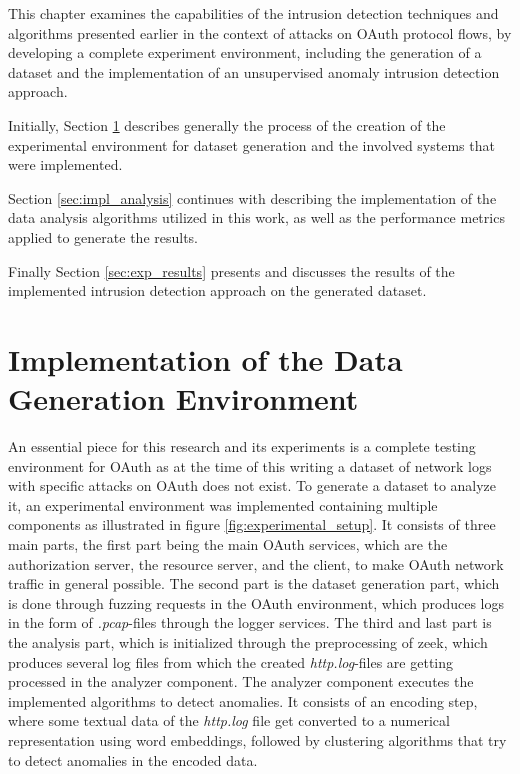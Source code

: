 
This chapter examines the capabilities of the intrusion detection techniques and algorithms presented earlier in the context of attacks on OAuth protocol flows, by developing a complete experiment environment, including the generation of a dataset and the implementation of an unsupervised anomaly intrusion detection approach.

Initially, Section \ref{sec:exp_setup} describes generally the process of the creation of the experimental environment for dataset generation and the involved systems that were implemented.

Section \ref{sec:impl_analysis} continues with describing the implementation of the data analysis algorithms utilized in this work, as well as the performance metrics applied to generate the results.

Finally Section \ref{sec:exp_results} presents and discusses the results of the implemented intrusion detection approach on the generated dataset.


\section{Implementation of the Data Generation Environment}
\label{sec:exp_setup}

An essential piece for this research and its experiments is a complete testing environment for OAuth as at the time of this writing a dataset of network logs with specific attacks on OAuth does not exist. To generate a dataset to analyze it, an experimental environment was implemented containing multiple components as illustrated in figure \ref{fig:experimental_setup}. It consists of three main parts, the first part being the main OAuth services, which are the authorization server, the resource server, and the client, to make OAuth network traffic in general possible. The second part is the dataset generation part, which is done through fuzzing requests in the OAuth environment, which produces logs in the form of \emph{.pcap}-files through the logger services. The third and last part is the analysis part, which is initialized through the preprocessing of zeek, which produces several log files from which the created \emph{http.log}-files are getting processed in the analyzer component. The analyzer component executes the implemented algorithms to detect anomalies. It consists of an encoding step, where some textual data of the \emph{http.log} file get converted to a numerical representation using word embeddings, followed by clustering algorithms that try to detect anomalies in the encoded data.

